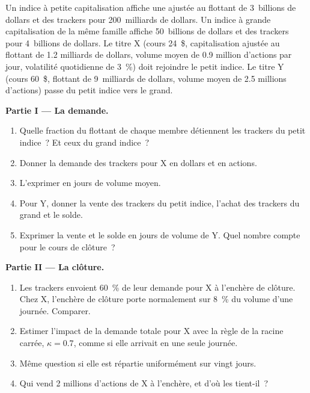 \begin{problem}\label{pb:m1:index-construction-and-rebalancing:1}
Un indice à petite capitalisation affiche une  ajustée au flottant
de 3~billions de dollars et des trackers pour 200~milliards de dollars. Un indice à grande capitalisation de la
même famille affiche 50~billions de dollars et des trackers pour 4~billions de dollars. Le titre X (cours
24~\$, capitalisation ajustée au flottant de 1.2 milliards de dollars, volume moyen de 0.9 million
d'actions par jour, volatilité quotidienne de 3~\%) doit rejoindre le petit indice. Le titre Y (cours
60~\$, flottant de 9~milliards de dollars, volume moyen de 2.5 millions d'actions) passe du
petit indice vers le grand.

\medskip\noindent\textbf{Partie I --- La demande.}
\begin{enumerate}
\item Quelle fraction du flottant de chaque membre détiennent les trackers du petit
indice~? Et ceux du grand indice~?
\item Donner la demande des trackers pour X en dollars et en actions.
\item L'exprimer en jours de volume moyen.
\item Pour Y, donner la vente des trackers du petit indice, l'achat des trackers du grand et
le solde.
\item Exprimer la vente et le solde en jours de volume de Y. Quel nombre
compte pour le cours de clôture~?
\end{enumerate}

\medskip\noindent\textbf{Partie II --- La clôture.}
\begin{enumerate}[resume]
\item Les trackers envoient 60~\% de leur demande pour X à l'enchère de clôture. Chez X,
l'enchère de clôture porte normalement sur 8~\% du volume d'une journée. Comparer.
\item Estimer l'impact de la demande totale pour X avec la règle de la racine
carrée, $\kappa = 0.7$, comme si elle arrivait en une seule journée.
\item Même question si elle est répartie uniformément sur vingt jours.
\item Qui vend 2 millions d'actions de X à l'enchère, et d'où
les tient-il~?
\end{enumerate}


\end{problem}
